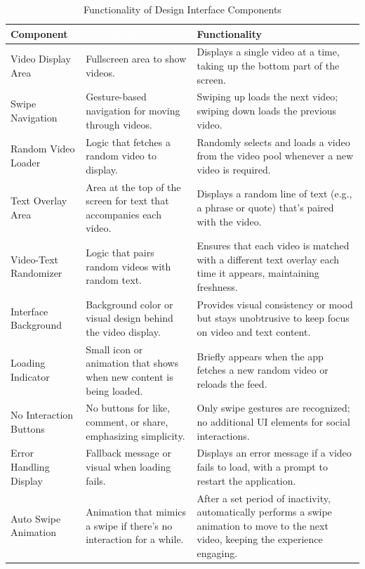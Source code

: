 \documentclass{article}
\begin{document}
\begin{table}[H]
    \centering
    \renewcommand{\arraystretch}{1.5}
    \setlength{\tabcolsep}{12pt}
    \begin{tabularx}{\textwidth}{|l|X|X|}
        \hline
        \cellcolor{TikTokRed}\textbf{Component} & \cellcolor{TikTokBlack}\textbf{\textcolor{white}{Description}} & \cellcolor{TikTokLightBlue}\textbf{Functionality} \\
        \hline
        Video Display Area & Fullscreen area to show videos. & Displays a single video at a time, taking up the bottom part of the screen. \\
        \hline
        Swipe Navigation & Gesture-based navigation for moving through videos. & Swiping up loads the next video; swiping down loads the previous video. \\
        \hline
        Random Video Loader & Logic that fetches a random video to display. & Randomly selects and loads a video from the video pool whenever a new video is required. \\
        \hline
        Text Overlay Area & Area at the top of the screen for text that accompanies each video. & Displays a random line of text (e.g., a phrase or quote) that’s paired with the video. \\
        \hline
        Video-Text Randomizer & Logic that pairs random videos with random text. & Ensures that each video is matched with a different text overlay each time it appears, maintaining freshness. \\
        \hline
        Interface Background & Background color or visual design behind the video display. & Provides visual consistency or mood but stays unobtrusive to keep focus on video and text content. \\
        \hline
        Loading Indicator & Small icon or animation that shows when new content is being loaded. & Briefly appears when the app fetches a new random video or reloads the feed. \\
        \hline
        No Interaction Buttons & No buttons for like, comment, or share, emphasizing simplicity. & Only swipe gestures are recognized; no additional UI elements for social interactions. \\
        \hline
        Error Handling Display & Fallback message or visual when loading fails. & Displays an error message if a video fails to load, with a prompt to restart the application. \\
        \hline
        Auto Swipe Animation & Animation that mimics a swipe if there’s no interaction for a while. & After a set period of inactivity, automatically performs a swipe animation to move to the next video, keeping the experience engaging. \\
        \hline
    \end{tabularx}
    \caption{Functionality of Design Interface Components}
\end{table}
\end{document}
